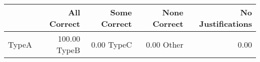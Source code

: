 \begin{tabular}{lrrrr}
\toprule
 & All Correct & Some Correct & None Correct & No Justifications \\
\midrule
TypeA & 100.00%
TypeB & 0.00%
TypeC & 0.00%
Other & 0.00%
\bottomrule
\end{tabular}
